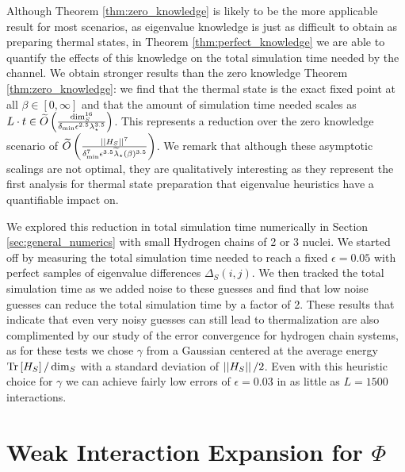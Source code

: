 Although Theorem \ref{thm:zero_knowledge} is likely to be the more applicable result for most scenarios, as eigenvalue knowledge is just as difficult to obtain as preparing thermal states, in Theorem \ref{thm:perfect_knowledge} we are able to quantify the effects of this knowledge on the total simulation time needed by the channel. We obtain stronger results than the zero knowledge Theorem \ref{thm:zero_knowledge}: we find that the thermal state is the exact fixed point at all $\beta \in [0, \infty]$ and that the amount of simulation time needed scales as $L \cdot t \in \widetilde{O} \left( \frac{\dim_S^{16}}{\delta_{\min} \epsilon^{2.5} \lambda_\star^{3.5}} \right)$. This represents a reduction over the zero knowledge scenario of $\widetilde{O} \left( \frac{\left| \left| H_S \right| \right|^7}{\delta_{\min}^7 \epsilon^{3.5} \widetilde{\lambda}_\star(\beta)^{3.5}} \right)$. We remark that although these asymptotic scalings are not optimal, they are qualitatively interesting as they represent the first analysis for thermal state preparation that eigenvalue heuristics have a quantifiable impact on. 

We explored this reduction in total simulation time numerically in Section \ref{sec:general_numerics} with small Hydrogen chains of 2 or 3 nuclei. We started off by measuring the total simulation time needed to reach a fixed $\epsilon = 0.05$ with perfect samples of eigenvalue differences $\Delta_S(i,j)$. We then tracked the total simulation time as we added noise to these guesses and find that low noise guesses can reduce the total simulation time by a factor of 2. These results that indicate that even very noisy guesses can still lead to thermalization are also complimented by our study of the error convergence for hydrogen chain systems, as for these tests we chose $\gamma$ from a Gaussian centered at the average energy $\operatorname{Tr} \left[  H_S  \right] / \dim_S$ with a standard deviation of $\left| \left| H_S \right| \right| / 2$. Even with this heuristic choice for $\gamma$ we can achieve fairly low errors of $\epsilon = 0.03$ in as little as $L = 1500$ interactions.




\section{Weak Interaction Expansion for $\Phi$} \label{sec:weak_coupling}
